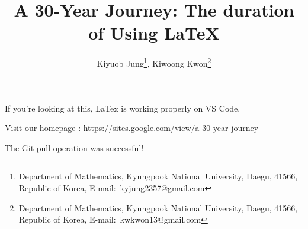 \documentclass[a4paper,11pt]{article}
\title{
    A 30-Year Journey: The duration of Using LaTeX
    }
\author{
    Kiyuob Jung\thanks{Department of Mathematics, Kyungpook National University, Daegu, 41566, Republic of Korea, E-mail:~kyjung2357@gmail.com},
    Kiwoong Kwon\thanks{Department of Mathematics, Kyungpook National University, Daegu, 41566, Republic of Korea, E-mail:~kwkwon13@gmail.com}
    }
\begin{document}
\date{}
\maketitle

If you're looking at this, LaTex is working properly on VS Code.

Visit our homepage : https://sites.google.com/view/a-30-year-journey

The Git pull operation was successful!
\end{document}
